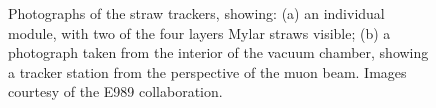 \begin{figure}[t!]
\centering{}
\hfill
{}
\caption{Photographs of the straw trackers, showing: (a) an individual module, with two of the four layers Mylar straws visible; (b) a photograph taken from the interior of the vacuum chamber, showing a tracker station from the perspective of the muon beam. Images courtesy of the E989 collaboration.}
\label{fig:TrackerPhotos}
\end{figure} 

